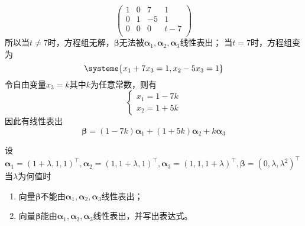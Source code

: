 \begin{solution}
\[        \left(\begin{array}{ccc|c}
                1 & 0 & 7  & 1   \\
                0 & 1 & -5 & 1   \\
                0 & 0 & 0  & t-7 \\
            \end{array}\right)
    \]
    所以当$t\neq 7$时，方程组无解，$\bm{\beta}$无法被$\bm{\alpha}_1,\bm{\alpha}_2,\bm{\alpha}_3$线性表出；
    当$t=7$时，方程组变为
    \[
        \systeme{
            x_1 + 7x_3 = 1,
            x_2 -5x_3 = 1
        }
    \]
    令自由变量$x_3=k$其中$k$为任意常数，则有
    \[
        \begin{cases}
            x_1 = 1 - 7k \\
            x_2 = 1+ 5k
        \end{cases}
    \]
    因此有线性表出
    \[ \bm{\beta} = (1-7k)\bm{\alpha}_1 + (1+5k)\bm{\alpha}_2 + k\bm{\alpha}_3 \]
\end{solution}
\begin{example}
    设$\bm{\alpha}_1=(1+\lambda,1,1)^\intercal,\bm{\alpha}_2=(1,1+\lambda,1)^\intercal,\bm{\alpha}_3 = (1,1,1+\lambda)^\intercal,\bm{\beta}=(0,\lambda,\lambda^2)^\intercal$
    当$\lambda$为何值时
    \begin{enumerate}[(1)]
        \item 向量$\bm{\beta}$不能由$\bm{\alpha}_1,\bm{\alpha}_2,\bm{\alpha}_3$线性表出；
        \item 向量$\bm{\beta}$能由$\bm{\alpha}_1,\bm{\alpha}_2,\bm{\alpha}_3$线性表出，并写出表达式。
    \end{enumerate}
\end{example}
